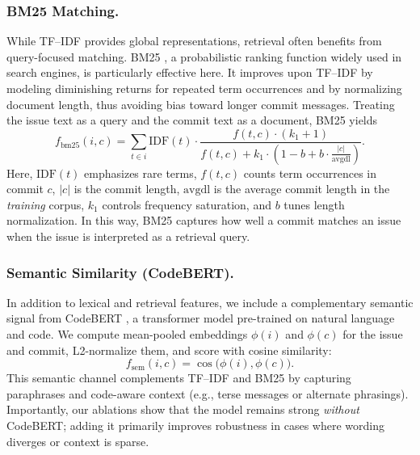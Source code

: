 \subsubsection{BM25 Matching.}
While TF--IDF provides global representations, retrieval often benefits from query-focused matching. BM25 \cite{bm25}, a probabilistic ranking function widely used in search engines, is particularly effective here. It improves upon TF--IDF by modeling diminishing returns for repeated term occurrences and by normalizing document length, thus avoiding bias toward longer commit messages. Treating the issue text as a query and the commit text as a document, BM25 yields
\[
f_{\text{bm25}}(i,c) = \sum_{t \in i} \text{IDF}(t) \cdot 
\frac{f(t,c)\cdot (k_1+1)}{f(t,c) + k_1\!\cdot\!\left(1 - b + b \cdot \tfrac{|c|}{\text{avgdl}}\right)}.
\]
Here, $\text{IDF}(t)$ emphasizes rare terms, $f(t,c)$ counts term occurrences in commit $c$, $|c|$ is the commit length, $\text{avgdl}$ is the average commit length in the \emph{training} corpus, $k_1$ controls frequency saturation, and $b$ tunes length normalization. In this way, BM25 captures how well a commit matches an issue when the issue is interpreted as a retrieval query.



\subsubsection{Semantic Similarity (CodeBERT).}
In addition to lexical and retrieval features, we include a complementary semantic signal from CodeBERT \cite{codebert}, a transformer model pre-trained on natural language and code. We compute mean-pooled embeddings $\phi(i)$ and $\phi(c)$ for the issue and commit, L2-normalize them, and score with cosine similarity:
\[
f_{\text{sem}}(i,c) = \cos\big(\phi(i), \phi(c)\big).
\]
This semantic channel complements TF--IDF and BM25 by capturing paraphrases and code-aware context (e.g., terse messages or alternate phrasings). Importantly, our ablations show that the model remains strong \emph{without} CodeBERT; adding it primarily improves robustness in cases where wording diverges or context is sparse.






